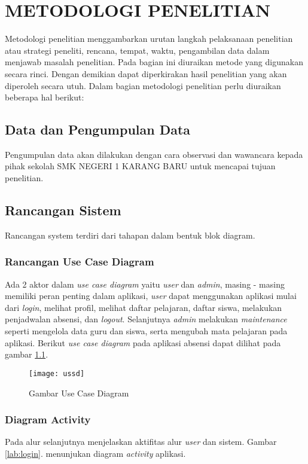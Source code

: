 \chapter{METODOLOGI PENELITIAN}
Metodologi penelitian menggambarkan urutan langkah pelaksanaan penelitian atau strategi peneliti, rencana, tempat, waktu, pengambilan data dalam menjawab masalah penelitian. Pada bagian ini diuraikan metode yang digunakan secara rinci. Dengan demikian dapat diperkirakan hasil penelitian yang akan diperoleh secara utuh. Dalam bagian metodologi penelitian perlu diuraikan beberapa hal berikut:

\section{Data dan Pengumpulan Data}
Pengumpulan data akan dilakukan dengan cara observasi dan wawancara kepada pihak sekolah SMK NEGERI 1 KARANG BARU untuk mencapai tujuan penelitian.

\section{Rancangan Sistem}
Rancangan system terdiri dari tahapan dalam bentuk blok diagram.

\subsection{Rancangan Use Case Diagram}

Ada 2 aktor dalam \emph{use case diagram} yaitu \emph{user} dan \emph{admin}, masing - masing memiliki peran penting dalam aplikasi, \emph{user} dapat menggunakan aplikasi mulai dari \emph{login}, melihat profil, melihat daftar pelajaran, daftar siswa, melakukan penjadwalan absensi, dan \emph{logout}. Selanjutnya \emph{admin} melakukan \emph{maintenance} seperti mengelola data guru dan siswa, serta mengubah mata pelajaran pada aplikasi. Berikut \emph{use case diagram} pada aplikasi absensi dapat dilihat pada gambar \ref{lab:use}.

\begin{figure}[h]
\centering
\texttt{[image: ussd]}
\caption{Gambar Use Case Diagram}
\label{lab:use}
\end{figure}


\subsection{Diagram Activity}
Pada alur selanjutnya menjelaskan aktifitas alur \emph{user} dan sistem. Gambar \ref{lab:login}. menunjukan diagram \emph{activity} aplikasi.

